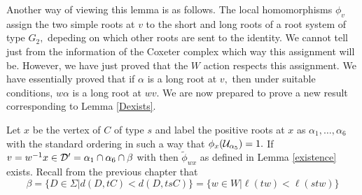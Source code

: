 \documentclass[class=book, crop=false]{standalone}
\begin{document}
Another way of viewing this lemma is as follows. The local homomorphisms $\phi_v$ assign the two simple roots at $v$ to the short and long roots of a root system of type $G_2,$ depeding on which other roots are sent to the identity. We cannot tell just from the information of the Coxeter complex which way this assignment will be. However, we have just proved that the $W$ action respects this assignment. We have essentially proved that if $\alpha$ is a long root at $v,$ then under suitable conditions, $w\alpha$ is a long root at $wv.$ We are now prepared to prove a new result corresponding to Lemma \ref{Dexists}.

\begin{lemma} 
	Let $x$ be the vertex of $C$ of type $s$ and label the positive roots at $x$ as $\alpha_1,\dots,\alpha_6$ with the standard ordering in such a way that $\phi_x(\mathcal{U}_{\alpha_5})=1.$ If $v=w^{-1}x\in \mathcal{D}'=\alpha_1\cap \alpha_6\cap \beta$ with then $\tilde{\phi}_{wx}$ as defined in Lemma \ref{existence} exists. Recall from the previous chapter that 
	\[
	\beta=\{D\in \Sigma|d(D,tC)<d(D,tsC)\}=\{w\in W|\ell(tw)<\ell(stw)\}
\]
	\label{336f2Dexists}
\end{lemma}
\end{document}
